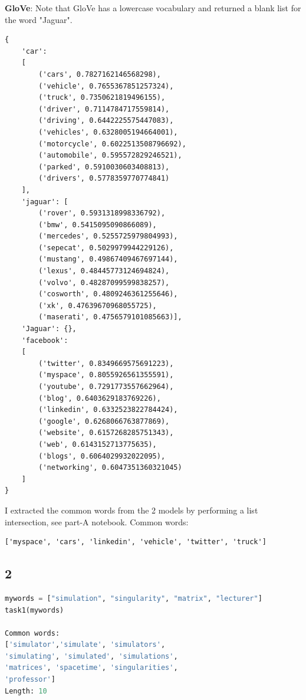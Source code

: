 \documentclass[8pt,a4paper]{report}%
\begin{document}
\textbf{GloVe}:
Note that GloVe has a lowercase vocabulary and returned a blank list for the word "Jaguar".

\begin{lstlisting}
{
    'car':
    [
        ('cars', 0.7827162146568298),
        ('vehicle', 0.7655367851257324),
        ('truck', 0.7350621819496155),
        ('driver', 0.7114784717559814),
        ('driving', 0.6442225575447083),
        ('vehicles', 0.6328005194664001),
        ('motorcycle', 0.6022513508796692),
        ('automobile', 0.595572829246521),
        ('parked', 0.5910030603408813),
        ('drivers', 0.5778359770774841)
    ],
    'jaguar': [
        ('rover', 0.5931318998336792),
        ('bmw', 0.5415095090866089),
        ('mercedes', 0.5255725979804993),
        ('sepecat', 0.5029979944229126),
        ('mustang', 0.49867409467697144),
        ('lexus', 0.48445773124694824),
        ('volvo', 0.48287099599838257),
        ('cosworth', 0.4809246361255646),
        ('xk', 0.47639670968055725),
        ('maserati', 0.4756579101085663)],
    'Jaguar': {},
    'facebook':
    [
        ('twitter', 0.8349669575691223),
        ('myspace', 0.8055926561355591),
        ('youtube', 0.7291773557662964),
        ('blog', 0.6403629183769226),
        ('linkedin', 0.6332523822784424),
        ('google', 0.6268066763877869),
        ('website', 0.6157268285751343),
        ('web', 0.6143152713775635),
        ('blogs', 0.6064029932022095),
        ('networking', 0.6047351360321045)
    ]
}
\end{lstlisting}

I extracted the common words from the 2 models by performing a list intersection, see part-A notebook. Common words:

\begin{lstlisting}
['myspace', 'cars', 'linkedin', 'vehicle', 'twitter', 'truck']
\end{lstlisting}


\subsection*{2}

\begin{lstlisting}[language=Python]
mywords = ["simulation", "singularity", "matrix", "lecturer"]
task1(mywords)

Common words:
['simulator','simulate', 'simulators',
'simulating', 'simulated', 'simulations',
'matrices', 'spacetime', 'singularities',
'professor']
Length: 10
\end{lstlisting}
\end{document}
